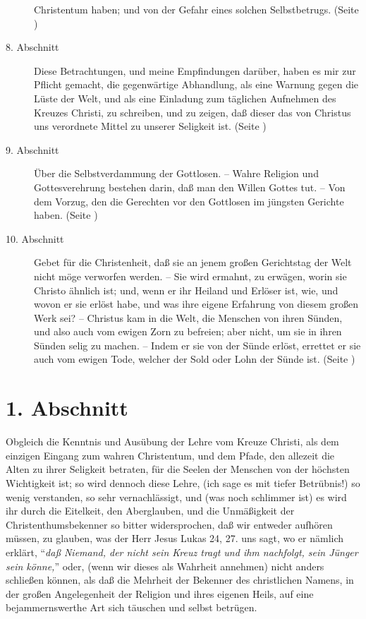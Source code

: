 \begin{description}
Christentum haben; und von der Gefahr eines solchen Selbstbetrugs. (Seite
\pageref{kap1_ab7})
\item[8. Abschnitt] Diese Betrachtungen, und meine Empfindungen darüber, haben
es mir zur Pflicht gemacht, die gegenwärtige Abhandlung, als eine Warnung gegen
die Lüste der Welt, und als eine Einladung zum täglichen Aufnehmen des Kreuzes
Christi, zu schreiben, und zu zeigen, daß dieser das von Christus uns verordnete
Mittel zu unserer Seligkeit ist. (Seite \pageref{kap1_ab8})
\item[9. Abschnitt] Über die Selbstverdammung der Gottlosen. -- Wahre Religion
und Gottesverehrung  bestehen darin, daß man den 
Willen Gottes tut. -- Von dem
Vorzug, den die Gerechten vor den Gottlosen im jüngsten Gerichte haben. (Seite
\pageref{kap1_ab9})
\item[10. Abschnitt] Gebet für die Christenheit, daß sie an jenem großen
Gerichtstag der Welt nicht möge verworfen werden. -- Sie wird ermahnt, zu
erwägen, worin sie Christo ähnlich ist; und, wenn er ihr Heiland und Erlöser
ist, wie, und wovon er sie erlöst habe, und was ihre eigene Erfahrung von diesem
großen Werk sei? -- Christus kam in die Welt, die Menschen von ihren Sünden, und
also auch vom ewigen Zorn zu befreien; aber nicht, um sie in ihren Sünden selig
zu machen. -- Indem er sie von der Sünde erlöst, errettet er sie auch vom ewigen
Tode, welcher der Sold oder Lohn der Sünde ist. (Seite \pageref{kap1_ab10})
\end{description}
\normalsize


\section{1. Abschnitt} \label{kap1_ab1}

Obgleich die Kenntnis und Ausübung der Lehre vom Kreuze Christi, als dem
einzigen Eingang zum wahren Christentum, und dem Pfade, den allezeit die Alten
zu ihrer Seligkeit betraten, für die Seelen der Menschen von der höchsten
Wichtigkeit ist; so wird dennoch diese Lehre, (ich sage es mit tiefer
Betrübnis!) so wenig verstanden, so sehr vernachlässigt, und (was noch
schlimmer ist) es wird ihr durch die Eitelkeit, den Aberglauben, und die
Unmäßigkeit der Christenthumsbekenner so bitter widersprochen, daß wir entweder
aufhören müssen, zu glauben, was der Herr Jesus Lukas 24,
27. uns sagt, wo er nämlich erklärt, "`\textit{daß
Niemand, der nicht sein Kreuz tragt und ihm nachfolgt, sein Jünger sein
könne,}"' oder, (wenn wir dieses als Wahrheit annehmen) nicht anders
schließen können, als daß die Mehrheit der Bekenner des christlichen Namens, in
der großen Angelegenheit der Religion und ihres eigenen Heils, auf eine
bejammernswerthe Art sich täuschen und selbst betrügen.

